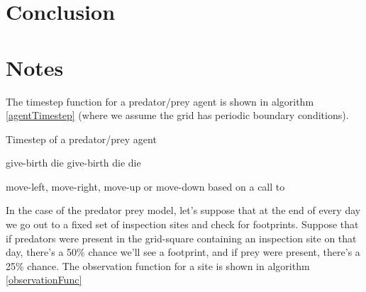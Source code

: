 \documentclass{article}
\begin{document}
\section{Conclusion}

\section{Notes}

The timestep function for a predator/prey agent is shown in algorithm \ref{agentTimestep} (where we assume the grid has periodic boundary conditions).

\begin{algorithm}
	\caption{Timestep of a predator/prey agent}
	\label{agentTimestep}
	\begin{algorithmic}
		\State\Return give-birth 
		\EndIf
		\State\Return die
		\EndIf
		\Else
		\State\Return give-birth
		\EndIf
		\State\Return die
		\EndIf
		\State\Return die 
		\EndIf
		
		\EndIf
		\State \Return move-left, move-right, move-up or move-down based on a call to 
		\EndFunction
	\end{algorithmic}
\end{algorithm}

In the case of the predator prey model, let's suppose that at the end of every day we go out to a fixed set of inspection sites and check for footprints. Suppose that if predators were present in the grid-square containing an inspection site on that day, there's a 50\% chance we'll see a footprint, and if prey were present, there's a 25\% chance. The observation function for a site is shown in algorithm \ref{observationFunc}
\end{document}
